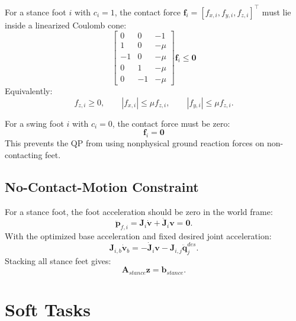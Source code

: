 \documentclass[11pt,a4paper]{article}
\begin{document}
For a stance foot $i$ with $c_i=1$, the contact force
$\bm{f}_i=[f_{x,i},f_{y,i},f_{z,i}]^\top$ must lie inside a linearized Coulomb cone:
\begin{equation}
	\boxed{
		\begin{bmatrix}
			0 & 0 & -1\\
			1 & 0 & -\mu\\
			-1 & 0 & -\mu\\
			0 & 1 & -\mu\\
			0 & -1 & -\mu
		\end{bmatrix}
		\bm{f}_i
		\leq
		\bm{0}
	}
	\label{eq:friction_pyramid}
\end{equation}
Equivalently:
\begin{equation}
	f_{z,i}\geq 0,\qquad
	|f_{x,i}|\leq \mu f_{z,i},\qquad
	|f_{y,i}|\leq \mu f_{z,i}.
\end{equation}

For a swing foot $i$ with $c_i=0$, the contact force must be zero:
\begin{equation}
	\boxed{
		\bm{f}_i = \bm{0}
	}
\end{equation}
This prevents the QP from using nonphysical ground reaction forces on non-contacting feet.

\subsection{No-Contact-Motion Constraint}

For a stance foot, the foot acceleration should be zero in the world frame:
\begin{equation}
	\ddot{\bm{p}}_{f,i}
	=
	\bm{J}_i\dot{\bm{v}}
	+
	\dot{\bm{J}}_i\bm{v}
	=
	\bm{0}.
\end{equation}
With the optimized base acceleration and fixed desired joint acceleration:
\begin{equation}
	\bm{J}_{i,b}\dot{\bm{v}}_b
	=
	-\dot{\bm{J}}_i\bm{v}
	-
	\bm{J}_{i,j}\ddot{\bm{q}}_j^{des}.
\end{equation}
Stacking all stance feet gives:
\begin{equation}
	\bm{A}_{stance}\bm{z}=\bm{b}_{stance}.
\end{equation}


\section{Soft Tasks}
\label{sec:soft_tasks}
\end{document}
